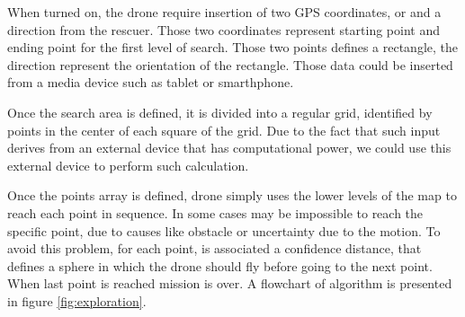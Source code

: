 \begin{figure}[p]
\end{figure}

When turned on, the drone require insertion of two GPS coordinates, or  and a direction from the rescuer. Those two coordinates represent starting point and ending point for the first level of search. Those two points defines a rectangle, the direction represent the orientation of the rectangle. Those data could be inserted from a media device such as tablet or smarthphone.

Once the search area is defined, it is divided into a regular grid, identified by points in the center of each square of the grid. Due to the fact that such input derives from an external device that has computational power, we could use this external device to perform such calculation.

Once the points array is defined, drone simply uses the lower levels of the map to reach each point in sequence. In some cases may be impossible to reach the specific point, due to causes like obstacle or uncertainty due to the motion. To avoid this problem, for each point, is associated a confidence distance, that defines a sphere in which the drone should fly before going to the next point. When last point is reached mission is over. A flowchart of algorithm is presented in figure \ref{fig:exploration}.

